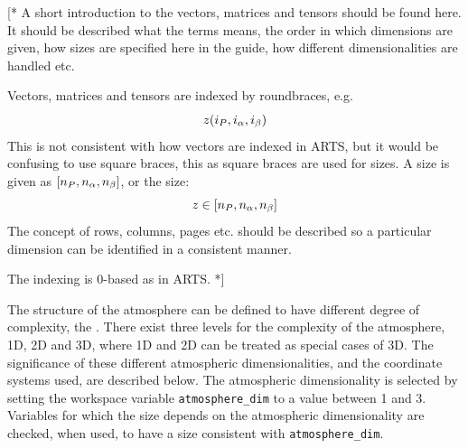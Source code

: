 \label{sec:fm_defs:math}

[* A short introduction to the vectors, matrices and tensors should be
found here. It should be described what the terms means, the order in
which dimensions are given, how sizes are specified here in the guide,
how different dimensionalities are handled etc. 

Vectors, matrices and tensors are indexed by roundbraces, e.g.
\begin{equation}
  z(i_{P},i_{\alpha},i_{\beta})
\end{equation}
This is not consistent with how vectors are indexed in ARTS, but it
would be confusing to use square braces, this as square braces are
used for sizes. A size is given as $
[n_{P},n_{\alpha},n_{\beta}]$, or the size:
\begin{equation}
  z \in [n_{P},n_{\alpha},n_{\beta}]
\end{equation}
The concept of rows, columns, pages etc. should be described so a
particular dimension can be identified in a consistent manner.

The indexing is 0-based as in ARTS. *]



\label{sec:fm_defs:atmosphere}


\label{sec:fm_defs:atmdim}

The structure of the atmosphere can be defined to have different
degree of complexity, the . There
exist three levels for the complexity of the atmosphere, 1D, 2D and
3D, where 1D and 2D can be treated as special cases of 3D. The
significance of these different atmospheric dimensionalities, and the
coordinate systems used, are described below. The atmospheric
dimensionality is selected by setting the workspace variable
\verb|atmosphere_dim| to a value between 1 and 3. Variables for which
the size depends on the atmospheric dimensionality are checked, when
used, to have a size consistent with \verb|atmosphere_dim|.

